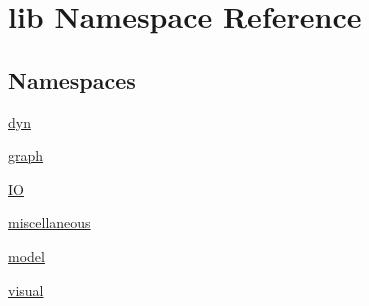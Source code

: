 \hypertarget{a00105}{\section{lib Namespace Reference}
\label{a00105}
}
\subsection*{Namespaces}
\begin{DoxyCompactItemize}
\item 
\hyperlink{a00106}{dyn}
\item 
\hyperlink{a00108}{graph}
\item 
\hyperlink{a00112}{I\-O}
\item 
\hyperlink{a00115}{miscellaneous}
\item 
\hyperlink{a00117}{model}
\item 
\hyperlink{a00120}{visual}
\end{DoxyCompactItemize}
